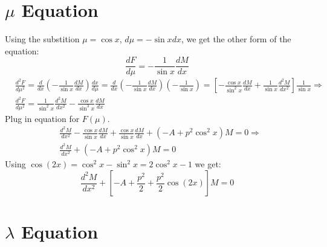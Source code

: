 \section{$ \mu $ Equation}
Using the substition $ \mu = \cos x $, $ d\mu = -\sin x dx $,  we get the other form of the equation:
\begin{equation}
\frac{dF}{d\mu} = -\frac{1}{\sin x}\frac{d M}{d x}
\end{equation}
\begin{equation}
\begin{split}
& \frac{d^2F}{d\mu^2} = \frac{d}{d x}\left(-\frac{1}{\sin x}\frac{d M}{d x}\right)\frac{d x}{d \mu} = \frac{d}{d x}\left(-\frac{1}{\sin x}\frac{d M}{d x}\right)\left(-\frac{1}{\sin x}\right) = \left[-\frac{\cos x}{\sin^2 x}\frac{d M}{d x} + \frac{1}{\sin x}\frac{d^2 M}{d x^2}\right]\frac{1}{\sin x} \Rightarrow \\[.8em]
& \frac{d^2 F}{d\mu^2} = \frac{1}{\sin^2 x}\frac{d^2 M}{d x^2} - \frac{\cos x}{\sin^3 x}\frac{d M}{d x}
\end{split}
\end{equation}
Plug in equation for $ F(\mu) $.
\begin{equation}\label{Feq}
\begin{split}
& \frac{d^2 M}{d x^2} - \frac{\cos x}{\sin x}\frac{d M}{d x} + \frac{\cos x}{\sin x}\frac{d M}{d x} + \left(-A + p^2\cos^2 x\right) M = 0 \Rightarrow \\[.8em]
& \frac{d^2 M}{d x^2} + \left(-A + p^2\cos^2x\right)M = 0
\end{split}
\end{equation}
Using $ \cos(2x) = \cos^2x - \sin^2x = 2\cos^2x - 1 $ we get:
\begin{equation}\label{Feq2-C}
\frac{d^2 M}{d x^2} + \left[-A + \frac{p^2}{2} + \frac{p^2}{2}\cos(2x) \right]M = 0 
\end{equation}

\section{$ \lambda $ Equation}

